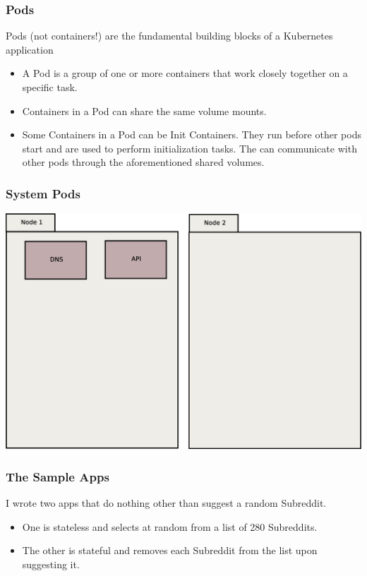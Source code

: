 \documentclass{beamer}
\begin{document}
\begin{frame}
\frametitle{Pods}
Pods (not containers!) are the fundamental building blocks of a Kubernetes application
\begin{itemize}
    \item A Pod is a group of one or more containers that work closely together on a specific task.
    \item Containers in a Pod can share the same volume mounts.
    \item Some Containers in a Pod can be Init Containers. They run before other pods start and are used to perform initialization tasks. The can communicate with other pods through the aforementioned shared volumes.
\end{itemize}
\end{frame}

\begin{frame}
    \frametitle{System Pods}
    \includegraphics[width=\textwidth,height=\textheight,keepaspectratio]{graphics/01-systemPods.eps}
\end{frame}

\begin{frame}
\frametitle{The Sample Apps}
I wrote two apps that do nothing other than suggest a random Subreddit.
\begin{itemize}
    \item One is stateless and selects at random from a list of 280 Subreddits.
    \item The other is stateful and removes each Subreddit from the list upon suggesting it.
\end{itemize}
\end{frame}
\end{document}
